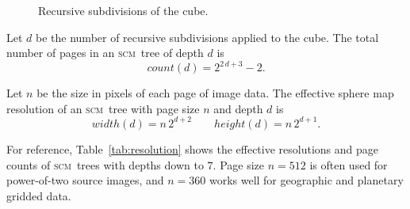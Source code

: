 \documentclass[oneside,10pt]{memoir}
\newcommand{\scm}     {\textsc{scm}}
\newcommand{\scmcount} [1]{\ensuremath{\mathit{count}(#1)}}
\newcommand{\scmwidth} [1]{\ensuremath{\mathit{width}(#1)}}
\newcommand{\scmheight}[1]{\ensuremath{\mathit{height}(#1)}}
\begin{document}
\begin{Spacing}{1.1}
\begin{figure}
  \centering
  \hfil
  \caption{Recursive subdivisions of the cube.}
  \label{fig:subdivision}
\end{figure}

Let $d$ be the number of recursive subdivisions applied to the cube. The total number of pages in an \scm\ tree of depth $d$ is
\[\scmcount{d}=2^{2\,d+3}-2.\]

Let $n$ be the size in pixels of each page of image data. The effective sphere map resolution of an \scm\ tree with page size $n$ and depth $d$ is
\[\scmwidth{d}=n\,2^{d+2}\qquad \scmheight{d}=n\,2^{d+1}.\]

For reference, Table~\ref{tab:resolution} shows the effective resolutions and page counts of \scm\ trees with depths down to $7$. Page size $n=512$ is often used for power-of-two source images, and $n=360$ works well for geographic and planetary gridded data.


\end{Spacing}
\end{document}
